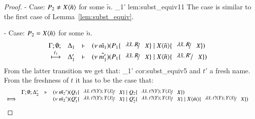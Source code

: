\begin{proof}
	\noi - Case: $P_2 \not= X\langle \tilde{n} \rangle$ for some $\tilde{n}$.
%
		{}
		{\Delta_1'}{}
		{lem:subst_equiv11}
%
	\noi The case is similar to the first case of Lemma~\ref{lem:subst_equiv}.

	\noi - Case: $P_2 = X\langle \tilde{n} \rangle$ for some $\tilde{n}$.
%
\[
	\mhorel	{\Gamma}{\Delta_1}{\newsp{\tilde{m_1}}{P_1 \subst{\abs{\tilde{x}}{R}}{X} \Par \appl{X}{\tilde{n}} \subst{\abs{\tilde{x}}{R}}{X}}}
		{\hby{\ell_1}}{\Delta_1'}{}{\newsp{\tilde{m_1'}}{P_1 \subst{\abs{\tilde{x}}{R}}{X} \Par \appl{X}{\tilde{n}} \subst{\abs{\tilde{x}}{R'}}{X}}}
\]
%
	\noi From the latter transition we get that:
%
	{}
	{}
	{\Delta_1'}{}
	{cor:subst_equiv5}
%
%
	\noi and $t'$ a fresh name. From the freshness of $t$
	it has to be the case that:
%
	\[
		\begin{array}{crll}
			& \Gamma; \es; \Delta_2'& \proves &
			\newsp{\tilde{m_2}'}{Q_1 \subst{\abs{\tilde{x}}{\binp{t}{Y} \appl{Y}{\tilde{x}}}}{X} \Par Q_2 \subst{\abs{\tilde{x}}{\binp{t}{Y} \appl{Y}{\tilde{x}}}}{X}}\\
			\Hby{} && &
			\newsp{\tilde{m_2}'}{Q_1' \subst{\abs{\tilde{x}}{\binp{t}{Y} \appl{Y}{\tilde{x}}}}{X} \Par Q_2' \subst{\abs{\tilde{x}}{\binp{t}{Y} \appl{Y}{\tilde{x}}}}{X} \Par \appl{X}{\tilde{m}} \subst{\abs{\tilde{x}}{\binp{t}{Y} \appl{Y}{\tilde{x}}}}{X}} \\

\end{array}\]
\end{proof}
